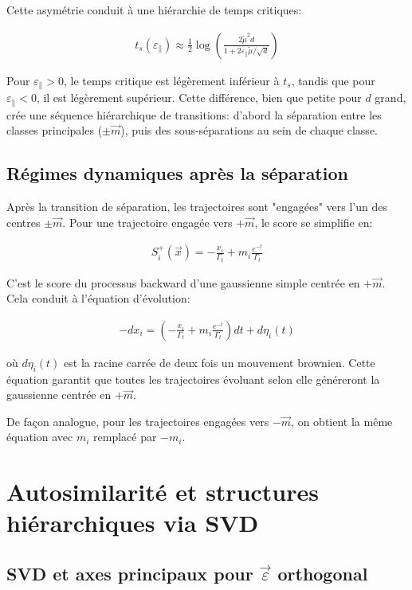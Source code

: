 \documentclass[11pt,a4paper]{article}
\begin{document}
Cette asymétrie conduit à une hiérarchie de temps critiques:

\begin{align}
t_s(\varepsilon_{\parallel}) \approx \frac{1}{2}\log\left(\frac{2\tilde{\mu}^2 d}{1 + 2\varepsilon_{\parallel}\tilde{\mu}/\sqrt{d}}\right)
\end{align}

Pour $\varepsilon_{\parallel} > 0$, le temps critique est légèrement inférieur à $t_s$, tandis que pour $\varepsilon_{\parallel} < 0$, il est légèrement supérieur. Cette différence, bien que petite pour $d$ grand, crée une séquence hiérarchique de transitions: d'abord la séparation entre les classes principales ($\pm\vec{m}$), puis des sous-séparations au sein de chaque classe.

\subsection{Régimes dynamiques après la séparation}

Après la transition de séparation, les trajectoires sont "engagées" vers l'un des centres $\pm\vec{m}$. Pour une trajectoire engagée vers $+\vec{m}$, le score se simplifie en:

\begin{align}
S_i^+(\vec{x}) = -\frac{x_i}{\Gamma_t} + m_i\frac{e^{-t}}{\Gamma_t}
\end{align}

C'est le score du processus backward d'une gaussienne simple centrée en $+\vec{m}$. Cela conduit à l'équation d'évolution:

\begin{align}
-dx_i = \left(-\frac{x_i}{\Gamma_t} + m_i\frac{e^{-t}}{\Gamma_t}\right)dt + d\eta_i(t)
\end{align}

où $d\eta_i(t)$ est la racine carrée de deux fois un mouvement brownien. Cette équation garantit que toutes les trajectoires évoluant selon elle généreront la gaussienne centrée en $+\vec{m}$.

De façon analogue, pour les trajectoires engagées vers $-\vec{m}$, on obtient la même équation avec $m_i$ remplacé par $-m_i$.

\section{Autosimilarité et structures hiérarchiques via SVD}

\subsection{SVD et axes principaux pour $\vec{\varepsilon}$ orthogonal}
\end{document}
